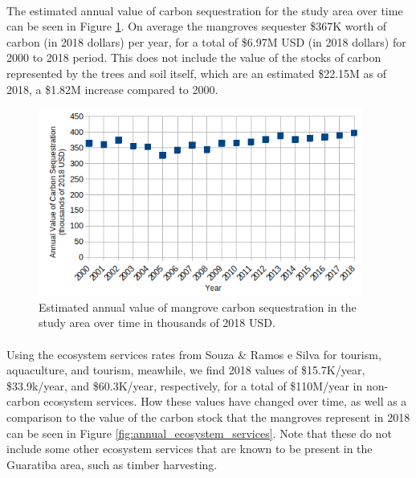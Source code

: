 \paragraph{} \leavevmode\newline

The estimated annual value of carbon sequestration for the study area over time can be seen in Figure \ref{fig:carbon_sequestration_value}. On average the mangroves sequester \$367K worth of carbon (in 2018 dollars) per year, for a total of \$6.97M USD (in 2018 dollars) for 2000 to 2018 period. This does not include the value of the stocks of carbon represented by the trees and soil itself, which are an estimated \$22.15M as of 2018, a \$1.82M increase compared to 2000.
    
\begin{figure}[!htb] 
\centering
\includegraphics[width=0.95\textwidth]{Figures/chap4/carbon_sequestration_value.png}
\caption[Annual Value of Mangrove Carbon Sequestration]{Estimated annual value of mangrove carbon sequestration in the study area over time in thousands of 2018 USD.}
\label{fig:carbon_sequestration_value}
\end{figure}

\paragraph{} \leavevmode\newline


Using the ecosystem services rates from Souza \& Ramos e Silva \cite{souzaEcologicalEconomicValuation2011} for tourism, aquaculture, and tourism, meawhile, we find 2018 values of \$15.7K/year, \$33.9k/year, and \$60.3K/year, respectively, for a total of \$110M/year in non-carbon ecosystem services. How these values have changed over time, as well as a comparison to the value of the carbon stock that the mangroves represent in 2018 can be seen in Figure \ref{fig:annual_ecosystem_services}. Note that these do not include some other ecosystem services that are known to be present in the Guaratiba area, such as timber harvesting.

